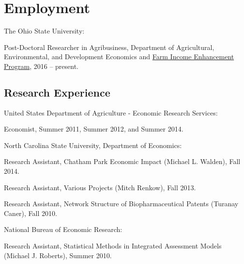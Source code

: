 \documentclass[letterpaper]{article}
\renewenvironment{itemize}{
  \begin{list}{}{
    \setlength{\leftmargin}{1.5em}
  }
}{
  \end{list}
}
\begin{document}
\section*{Employment}
\begin{itemize}
\item The Ohio State University:
\begin{itemize}
\item Post-Doctoral Researcher in Agribusiness, Department of Agricultural, Environmental, and Development Economics and \href{http://aede.osu.edu/programs/farm-income-enhancement-program}{Farm Income Enhancement Program}, 2016 -- present.
\end{itemize}
\end{itemize}

\subsection*{Research Experience}
\begin{itemize}
\item United States Department of Agriculture - Economic Research Services:
\begin{itemize}
\item Economist, Summer 2011, Summer 2012, and Summer 2014.
\end{itemize}

\item North Carolina State University, Department of Economics:
\begin{itemize}
\item Research Assistant, Chatham Park Economic Impact (Michael L. Walden), Fall 2014.
\item Research Assistant, Various Projects (Mitch Renkow), Fall 2013.
\item Research Assistant, Network Structure of Biopharmaceutical Patents (Turanay Caner), Fall 2010.
\end{itemize}

\item National Bureau of Economic Research:
\begin{itemize}
\item Research Assistant, Statistical Methods in Integrated Assessment Models (Michael J. Roberts), Summer 2010.
\end{itemize}
\end{itemize}
\end{document}
